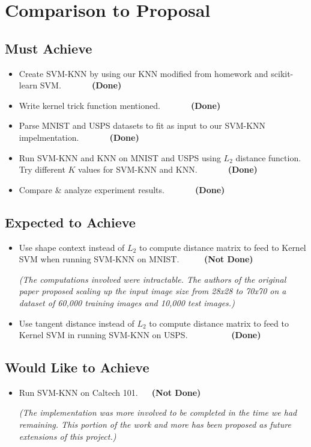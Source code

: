 \documentclass[11pt,letterpaper]{article}
\begin{document}
\section{Comparison to Proposal}

\subsection{Must Achieve}

\begin{itemize}
\item Create SVM-KNN by using our KNN modified from homework and scikit-learn SVM. $\>\>\>\>\>\>\>\>\>\>\>\>\>\>\>$\textbf{(Done)}
\item Write kernel trick function mentioned. $\>\>\>\>\>\>\>\>\>\>\>\>\>\>\>$\textbf{(Done)}
\item Parse MNIST and USPS datasets to fit as input to our SVM-KNN impelmentation. $\>\>\>\>\>\>\>\>\>\>\>\>\>\>\>$\textbf{(Done)}
\item Run SVM-KNN and KNN on MNIST and USPS using $L_2$ distance function. Try different $K$ values for SVM-KNN and KNN. $\>\>\>\>\>\>\>\>\>\>\>\>\>\>\>$\textbf{(Done)}
\item Compare $\&$ analyze experiment results. $\>\>\>\>\>\>\>\>\>\>\>\>\>\>\>$\textbf{(Done)}
\end{itemize}

\subsection{Expected to Achieve}
\begin{itemize}
\item Use shape context instead of $L_2$ to compute distance matrix to feed to Kernel SVM when running SVM-KNN on MNIST. $\>\>\>\>\>\>\>\>\>\>\>\>$\textbf{(Not Done)}

\textit{(The computations involved were intractable. The authors of the original paper proposed scaling up the input image size from 28x28 to 70x70 on a dataset of 60,000 training images and 10,000 test images.)}
\item Use tangent distance instead of $L_2$ to compute distance matrix to feed to Kernel SVM in running SVM-KNN on USPS. $\>\>\>\>\>\>\>\>\>\>\>\>\>\>\>\>\>\>\>\>\>\>$\textbf{(Done)}
\end{itemize}

\subsection{Would Like to Achieve}
\begin{itemize}
\item Run SVM-KNN on Caltech 101. $\>\>\>\>\>\>$\textbf{(Not Done)}

\textit{(The implementation was more involved to be completed in the time we had remaining. This portion of the work and more has been proposed as future extensions of this project.)}
\end{itemize}
\end{document}
